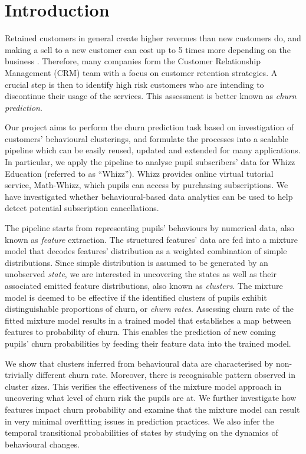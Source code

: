 \section{Introduction}
\label{sec:intro}

Retained customers in general create higher revenues than new customers do, and making a sell to a new customer can cost up to 5 times more depending on the business \cite{Slater2000}. Therefore, many companies form the Customer Relationship Management (CRM) team with a focus on customer retention strategies. A crucial step is then to identify high risk customers who are intending to discontinue their usage of the services. This assessment is better known as \textit{churn prediction}.

Our project aims to perform the churn prediction task based on investigation of customers' behavioural clusterings, and formulate the processes into a scalable pipeline which can be easily reused, updated and extended for many applications. In particular, we apply the pipeline to analyse pupil subscribers' data for Whizz Education (referred to as ``Whizz''). Whizz provides online virtual tutorial service, Math-Whizz, which pupils can access by purchasing subscriptions. We have investigated whether behavioural-based data analytics can be used to help detect potential subscription cancellations.

The pipeline starts from representing pupils' behaviours by numerical data, also known as \textit{feature} extraction. The structured features' data are fed into a mixture model that decodes features' distribution as a weighted combination of simple distributions. Since simple distribution is assumed to be generated by an unobserved \textit{state}, we are interested in uncovering the states as well as their associated emitted feature distributions, also known as \textit{clusters}. The mixture model is deemed to be effective if the identified clusters of pupils exhibit distinguishable proportions of churn, or \textit{churn rates}. Assessing churn rate of the fitted mixture model results in a trained model that establishes a map between features to probability of churn. This enables the prediction of new coming pupils' churn probabilities by feeding their feature data into the trained model.

We show that clusters inferred from behavioural data are characterised by non-trivially different churn rate. Moreover, there is recognisable pattern observed in cluster sizes. This verifies the effectiveness of the mixture model approach in uncovering what level of churn risk the pupils are at. We further investigate how features impact churn probability and examine that the mixture model can result in very minimal overfitting issues in prediction practices. We also infer the temporal transitional probabilities of states by studying on the dynamics of behavioural changes.

